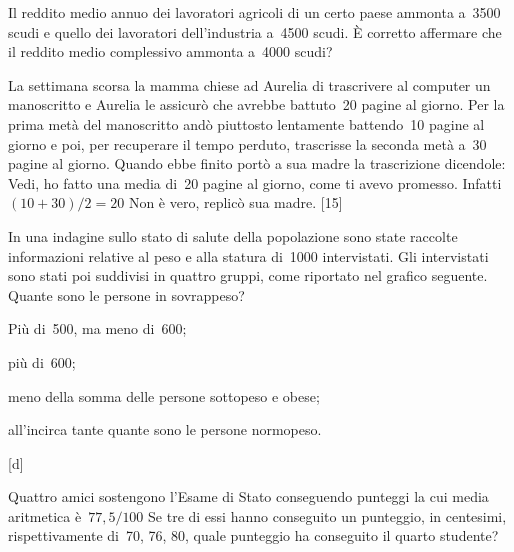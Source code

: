 \begin{esercizio}
\label{ese:A.48}
Il reddito medio annuo dei lavoratori agricoli di un certo paese ammonta 
a~3500 scudi e quello dei lavoratori dell'industria
a~4500 scudi. È corretto affermare che il reddito medio complessivo ammonta 
a~4000 scudi?
\end{esercizio}

\begin{esercizio}
\label{ese:A.49}
La settimana scorsa la mamma chiese ad Aurelia di trascrivere al computer 
un manoscritto e Aurelia le assicurò che avrebbe
battuto~20 pagine al giorno. Per la prima metà del manoscritto andò 
piuttosto lentamente battendo~10 pagine al giorno e poi,
per recuperare il tempo perduto, trascrisse la seconda metà a~30 pagine al 
giorno.
Quando ebbe finito portò a sua madre la trascrizione dicendole: Vedi, ho 
fatto una media di~20 pagine al giorno,
come ti avevo promesso. Infatti~$(10+30)/2=20$ Non è vero, replicò sua 
madre.
\hfill [15]
\end{esercizio}

\begin{esercizio}
\label{ese:A.50}
In una indagine sullo stato di salute della popolazione sono state raccolte 
informazioni relative al peso e
alla statura di~1000 intervistati. Gli intervistati sono stati poi 
suddivisi in quattro gruppi,
come riportato nel grafico seguente. Quante sono le persone in sovrappeso?

\begin{enumeratea}
 \item Più di~500, ma meno di~600;
 \item più di~600;
 \item meno della somma delle persone sottopeso e obese;
 \item all'incirca tante quante sono le persone normopeso.
\end{enumeratea}
\begin{center}
 
\hfill [d]
\end{center}

\end{esercizio}

\begin{esercizio}
\label{ese:A.51}
Quattro amici sostengono l'Esame di Stato conseguendo punteggi la cui media 
aritmetica è~$77,5/100$
Se tre di essi hanno conseguito un punteggio, in centesimi, rispettivamente 
di~70, 76, 80, quale punteggio ha conseguito il quarto studente?
\end{esercizio}

